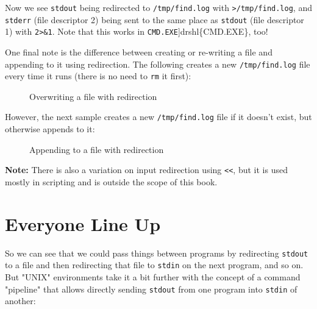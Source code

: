 \documentclass[10pt,american,]{book}
\newenvironment{Shaded}{\begin{snugshade}}{\end{snugshade}}
\newcommand{\KeywordTok}[1]{\textcolor[rgb]{0.13,0.29,0.53}{\textbf{{#1}}}}
\newcommand{\DataTypeTok}[1]{\textcolor[rgb]{0.13,0.29,0.53}{{#1}}}
\newcommand{\NormalTok}[1]{{#1}}
\numberwithin{figure}{chapter}
\DeclareRobustCommand{\drcap}[1]{\begin{figure}[H]\caption{#1}\end{figure}}
\renewcommand{\KeywordTok}[1]{{#1}}
\renewcommand{\DataTypeTok}[1]{{#1}}
\renewcommand{\NormalTok}[1]{{#1}}
\begin{document}
Now we see \texttt{stdout} being redirected to \texttt{/tmp/find.log}
with \texttt{\textgreater{}/tmp/find.log}, and \texttt{stderr} (file
descriptor 2) being sent to the same place as \texttt{stdout} (file
descriptor 1) with \texttt{2\textgreater{}\&1}. Note that this works in
\texttt{CMD.EXE}{]}drshl\{CMD.EXE\}, too!

One final note is the difference between creating or re-writing a file
and appending to it using redirection. The following creates a new
\texttt{/tmp/find.log} file every time it runs (there is no need to
\texttt{rm} it first):

\drcap{Overwriting a file with redirection}

\begin{Shaded}
\end{Shaded}

However, the next sample creates a new \texttt{/tmp/find.log} file if it
doesn't exist, but otherwise appends to it:

\drcap{Appending to a file with redirection}

\begin{Shaded}
\end{Shaded}

\textbf{Note:} There is also a variation on input redirection using
\texttt{\textless{}\textless{}}, but it is used mostly in scripting and
is outside the scope of this book.

\section*{Everyone Line Up}\label{everyone-line-up}

So we can see that we could pass things between programs by redirecting
\texttt{stdout} to a file and then redirecting that file to
\texttt{stdin} on the next program, and so on. But "UNIX" environments
take it a bit further with the concept of a command "pipeline" that
allows directly sending \texttt{stdout} from one program into
\texttt{stdin} of another:
\end{document}
